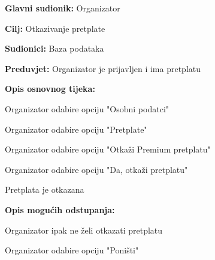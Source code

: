					\noindent {}
					\begin{packed_item}
	
						\item \textbf{Glavni sudionik:} Organizator
						\item  \textbf{Cilj:} Otkazivanje pretplate
						\item  \textbf{Sudionici:} Baza podataka
						\item  \textbf{Preduvjet:} Organizator je prijavljen i ima pretplatu
						\item  \textbf{Opis osnovnog tijeka:}
						
						\item[] \begin{packed_enum}
	
							\item Organizator odabire opciju "Osobni podatci"
							\item Organizator odabire opciju "Pretplate"
							\item Organizator odabire opciju "Otkaži Premium pretplatu"
							\item Organizator odabire opciju "Da, otkaži pretplatu"
							\item Pretplata je otkazana
						\end{packed_enum}
						
						\item  \textbf{Opis mogućih odstupanja:}
						
						\item[] \begin{packed_item}
	
							\item[4.a] Organizator ipak ne želi otkazati pretplatu
							\item[] \begin{packed_enum}
								
								\item Organizator odabire opciju "Poništi"
								
							\end{packed_enum}
						\end{packed_item}
					\end{packed_item}
					
